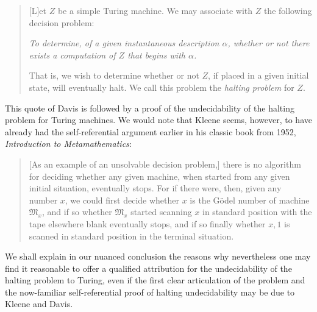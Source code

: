 \documentclass{amsart}
\begin{document}
\begin{quote}\small

[L]et $Z$ be a simple Turing machine. We may associate with $Z$ the following decision problem: 

\textit{To determine, of a given instantaneous description $\alpha$, whether or not there exists a computation of $Z$ that begins with $\alpha$.}

That is, we wish to determine whether or not $Z$, if placed in a given initial state, will eventually halt. We call this problem the \textit{halting problem} for $Z$. \cite[p. 70]{davis1958computability}
\end{quote}
This quote of Davis is followed by a proof of the undecidability of the halting problem for Turing machines. %
We would note that Kleene seems, however, to have already had the self-referential argument earlier in his classic book from 1952, \textit{Introduction to Metamathematics}:
\begin{quote}\small
    [As an example of an unsolvable decision problem,] there is no algorithm for deciding whether any given machine, when started from any given initial situation, eventually stops. For if there were, then, given any number $x$, we could first decide whether $x$ is the Gödel number of machine $\mathfrak{M}_x$, and if so whether $\mathfrak{M}_x$ started scanning $x$ in standard position with the tape elsewhere blank eventually stops, and if so finally whether $x,\!1$ is scanned in standard position in the terminal situation. \cite[p. 382]{kleene1952metamathematics}
\end{quote}
We shall explain in our nuanced conclusion the reasons why nevertheless one may find it reasonable to offer a qualified attribution for the undecidability of the halting problem to Turing, even if the first clear articulation of the problem and the now-familiar self-referential proof of halting undecidability may be due to Kleene and Davis.
\end{document}
